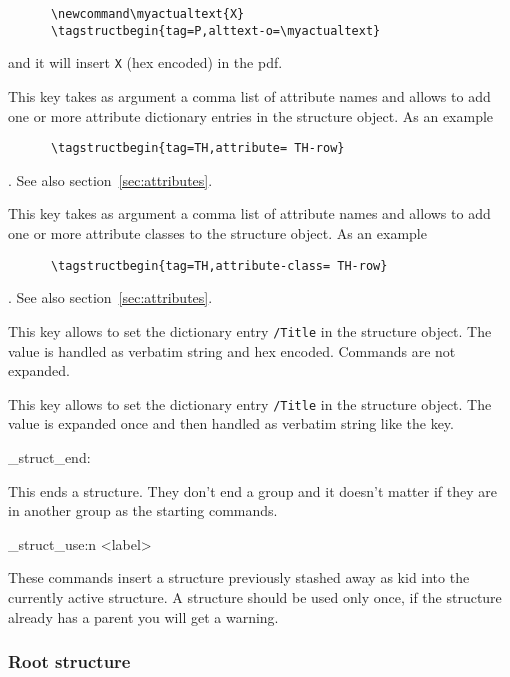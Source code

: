 \documentclass[DIV=12,parskip=half-,bibliography=totoc]{scrartcl}
\begin{document}
\begin{description}
      \begin{lstlisting}
      \newcommand\myactualtext{X}
      \tagstructbegin{tag=P,alttext-o=\myactualtext}
      \end{lstlisting}

      and it will insert \verb+X+ (hex encoded)  in the pdf.
    \item[\PrintKeyName{attribute}] This key takes as argument a comma list of attribute names and allows to add one or more attribute dictionary entries in the structure object. As an example
      \begin{lstlisting}
      \tagstructbegin{tag=TH,attribute= TH-row}
      \end{lstlisting}. See also section~\ref{sec:attributes}.
  \item[\PrintKeyName{attribute-class}] This key takes as argument a comma list of attribute names and allows to add one or more attribute classes to the structure object. As an example
      \begin{lstlisting}
      \tagstructbegin{tag=TH,attribute-class= TH-row}
      \end{lstlisting}. See also section~\ref{sec:attributes}.
    
  \item[\PrintKeyName{title}] This key allows to set the dictionary entry \texttt{/Title} in the structure object.
      The value is handled as verbatim string and hex encoded. Commands are not expanded.
  \item[\PrintKeyName{title-o}] This key allows to set the dictionary entry \texttt{/Title} in the structure object.
      The value is expanded once and then handled as verbatim string like the  key.
\end{description}


\ExplSyntaxOn
\DescribeMacro\tagstructend
\DescribeMacro\uftag_struct_end:
\ExplSyntaxOff

This ends a structure. They don't end a group and it doesn't matter if they are in another group as the starting commands.

\ExplSyntaxOn
\DescribeMacro{}
\DescribeMacro\uftag_struct_use:n {<label>}
\ExplSyntaxOff

These commands insert a structure previously stashed away as kid into the currently active structure. A structure should be used only once, if the structure already has a parent you will get a warning.

\subsubsection{Root structure}
\end{document}

